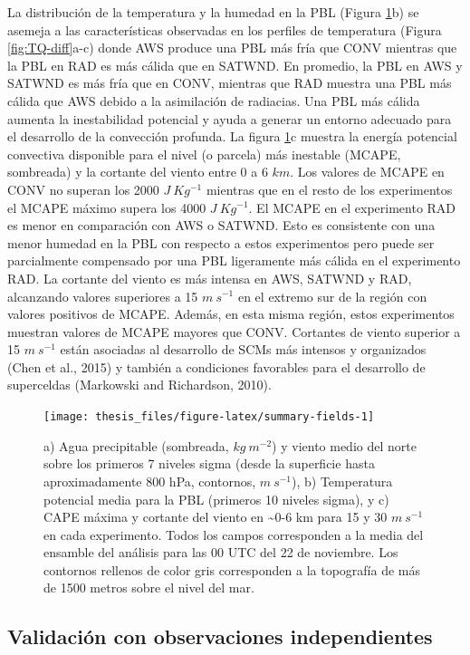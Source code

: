 \documentclass[12pt,oneside]{reedthesis}
\begin{document}
La distribución de la temperatura y la humedad en la PBL (Figura \ref{fig:summary-fields}b) se asemeja a las características observadas en los perfiles de temperatura (Figura \ref{fig:TQ-diff}a-c) donde AWS produce una PBL más fría que CONV mientras que la PBL en RAD es más cálida que en SATWND. En promedio, la PBL en AWS y SATWND es más fría que en CONV, mientras que RAD muestra una PBL más cálida que AWS debido a la asimilación de radiacias. Una PBL más cálida aumenta la inestabilidad potencial y ayuda a generar un entorno adecuado para el desarrollo de la convección profunda. La figura \ref{fig:summary-fields}c muestra la energía potencial convectiva disponible para el nivel (o parcela) más inestable (MCAPE, sombreada) y la cortante del viento entre 0 a 6 \(km\). Los valores de MCAPE en CONV no superan los 2000 \(J\ Kg^{-1}\) mientras que en el resto de los experimentos el MCAPE máximo supera los 4000 \(J\ Kg^{-1}\). El MCAPE en el experimento RAD es menor en comparación con AWS o SATWND. Esto es consistente con una menor humedad en la PBL con respecto a estos experimentos pero puede ser parcialmente compensado por una PBL ligeramente más cálida en el experimento RAD. La cortante del viento es más intensa en AWS, SATWND y RAD, alcanzando valores superiores a 15 \(m\ s^{-1}\) en el extremo sur de la región con valores positivos de MCAPE. Además, en esta misma región, estos experimentos muestran valores de MCAPE mayores que CONV. Cortantes de viento superior a 15 \(m\ s^{-1}\) están asociadas al desarrollo de SCMs más intensos y organizados (Chen et al., 2015) y también a condiciones favorables para el desarrollo de superceldas (Markowski and Richardson, 2010).


\begin{figure}
\texttt{[image: thesis\_files/figure-latex/summary-fields-1]} \caption{a) Agua precipitable (sombreada, \(kg\ m^{-2}\)) y viento medio del norte sobre los primeros 7 niveles sigma (desde la superficie hasta aproximadamente 800 hPa, contornos, \(m\ s^{-1}\)), b) Temperatura potencial media para la PBL (primeros 10 niveles sigma), y c) CAPE máxima y cortante del viento en \textasciitilde0-6 km para 15 y 30 \(m\ s^{-1}\) en cada experimento. Todos los campos corresponden a la media del ensamble del análisis para las 00 UTC del 22 de noviembre. Los contornos rellenos de color gris corresponden a la topografía de más de 1500 metros sobre el nivel del mar.}\label{fig:summary-fields}
\end{figure}
\hypertarget{validaciuxf3n-con-observaciones-independientes}{%
\subsection{Validación con observaciones independientes}\label{validaciuxf3n-con-observaciones-independientes}}
\end{document}
